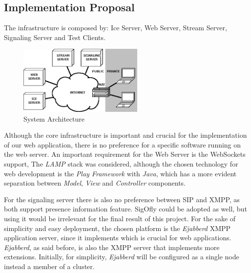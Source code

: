 
\subsection{Implementation Proposal}
The infrastructure is composed by: Ice Server, Web Server, Stream Server, Signaling Server and Test Clients.

\begin{figure}[H]
	\centering
	\includegraphics[width=0.55\textwidth]{figures/arch.png}
	\caption{System Architecture}
\end{figure}

Although the core infrastructure is important and crucial for the implementation of our web application, there is no preference for a specific software running on the web server. An important requirement for the Web Server is the WebSockets support, The \emph{LAMP} stack was considered, although the chosen technology for web development is the \emph{Play Framework} with \emph{Java}, which has a more evident separation between \emph{Model}, \emph{View} and \emph{Controller} components.

For the signaling server there is also no preference between \ac{SIP} and \ac{XMPP}, as both support presence information feature. \ac{SigOfly} could be adopted as well, but using it would be irrelevant for the final result of this project. For the sake of simplicity and easy deployment, the chosen platform is the \emph{Ejabberd} \ac{XMPP} application server, since it implements \cite{xep0206} which is crucial for web applications. \emph{Ejabberd}, as said before, is also the \ac{XMPP} server that implements more extensions. Initially, for simplicity, \emph{Ejabberd} will be configured as a single node instead a member of a cluster. 

